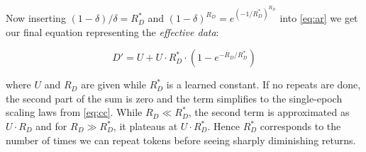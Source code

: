 \documentclass{article}
\begin{document}
Now inserting $(1-\delta)/\delta=R_D^*$ and $(1-\delta)^{R_D}= e^{(-1/R^*_D)^{R_D}}$ into \autoref{eq:ar} we get our final equation representing the \emph{effective data}:

\begin{equation}\label{eq:dterm}
D' = U + U\cdot R_D^* \cdot(1- e^{-R_D/R_D^*})
\end{equation}

where $U$ and $R_D$ are given while $R_D^*$ is a learned constant. If no repeats are done, the second part of the sum is zero and the term simplifies to the single-epoch scaling laws from \autoref{eq:cc}. While $R_D \ll R_D^*$, the second term is approximated as $U\cdot R_D$ and for $R_D \gg R_D^*$, it plateaus at $U\cdot R_D^*$. Hence $R^*_D$ corresponds to the number of times we can repeat tokens before seeing sharply diminishing returns.

\end{document}
